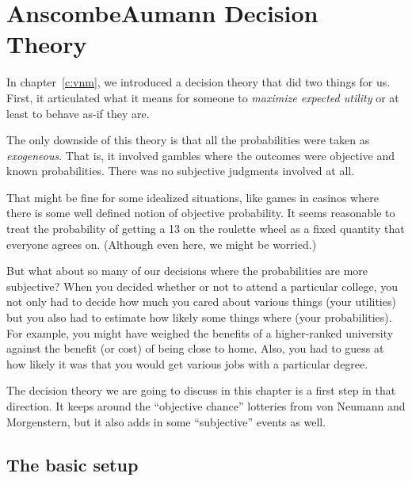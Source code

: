 

\chapter{Anscombe\breakslash Aumann Decision Theory}
\label{c:aa}

In chapter~\ref{c:vnm}, we introduced a decision theory that did two things for us.  First, it articulated what it means for someone to {\it maximize expected utility} or at least to behave as-if they are. 

The only downside of this theory is that all the probabilities were taken as {\it exogeneous}. That is, it involved gambles where the outcomes were objective and known probabilities.  There was no subjective judgments involved at all.  

That might be fine for some idealized situations, like games in casinos where there is some well defined notion of objective probability. It seems reasonable to treat the probability of getting a 13 on the roulette wheel as a fixed quantity that everyone agrees on.  (Although even here, we might be worried.)

But what about so many of our decisions where the probabilities are more subjective? When you decided whether or not to attend a particular college, you not only had to decide how much you cared about various things (your utilities) but you also had to estimate how likely some things where (your probabilities). For example, you might have weighed the benefits of a higher-ranked university against the benefit (or cost) of being close to home. Also, you had to guess at how likely it was that you would get various jobs with a particular degree.

The decision theory we are going to discuss in this chapter is a first step in that direction.  It keeps around the ``objective chance'' lotteries from von Neumann and Morgenstern, but it also adds in some ``subjective'' events as well. 

\section{The basic setup}

